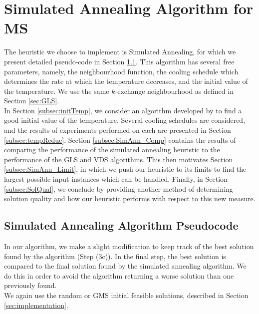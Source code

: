\documentclass[12pt,a4paper,reqno]{article}
\begin{document}
\newpage
\section{Simulated Annealing Algorithm for MS}
\label{sec:simulatedannealing}

The heuristic we choose to implement is Simulated Annealing, for which we present detailed pseudo-code in Section \ref{subsec:SA_pseudo}. This algorithm has several free parameters, namely, the neighbourhood function, the cooling schedule which determines the rate at which the temperature decreases, and the initial value of the temperature. We use the same $k$-exchange neighbourhood as defined in Section \ref{sec:GLS}. \\

In Section \ref{subsec:initTemp}, we consider an algorithm developed by \citet{ameur2004} to find a good initial value of the temperature. Several cooling schedules are considered, and the results of experiments performed on each are presented in Section \ref{subsec:tempReduc}. Section \ref{subsec:SimAnn_Comp} contains the results of comparing the performance of the simulated annealing heuristic to the performance of the GLS and VDS algorithms. This then motivates Section \ref{subsec:SimAnn_Limit}, in which we push our heuristic to its limits to find the largest possible input instances which can be handled. Finally, in Section \ref{subsec:SolQual}, we conclude by providing another method of determining solution quality and how our heuristic performs with respect to this new measure.

\subsection{Simulated Annealing Algorithm Pseudocode}
\label{subsec:SA_pseudo}
In our algorithm, we make a slight modification to keep track of the best solution found by the algorithm (Step (3c)). In the final step, the best solution is compared to the final solution found by the simulated annealing algorithm. We do this in order to avoid the algorithm returning a worse solution than one previously found. \\

We again use the random or GMS initial feasible solutions, described in Section \ref{sec:implementation}. \\
\end{document}
